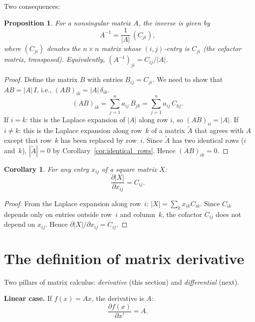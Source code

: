\documentclass[14pt]{extarticle}
\theoremstyle{plain}
\newtheorem{corollary}[theorem]{Corollary}
\newtheorem{proposition}{Proposition}
\theoremstyle{definition}
\theoremstyle{remark}
\begin{document}
Two consequences:

\begin{proposition}\label{prp:cofactor_inverse}
For a nonsingular matrix $A$, the inverse is given by
\[
A^{-1} = \frac{1}{|A|}\, (C_{ji}),
\]
where $(C_{ji})$ denotes the $n \times n$ matrix whose $(i,j)$-entry is $C_{ji}$ (the cofactor matrix, transposed). Equivalently, $(A^{-1})_{ji} = C_{ij}/|A|$.
\end{proposition}

\begin{proof}
Define the matrix $B$ with entries $B_{ij} = C_{ji}$. We need to show that $AB = |A|\, I$, i.e., $(AB)_{ik} = |A|\, \delta_{ik}$.
\[
(AB)_{ik} = \sum_{j=1}^{n} a_{ij}\, B_{jk} = \sum_{j=1}^{n} a_{ij}\, C_{kj}.
\]
If $i = k$: this is the Laplace expansion of $|A|$ along row $i$, so $(AB)_{ii} = |A|$.
If $i \neq k$: this is the Laplace expansion along row~$k$ of a matrix $\tilde{A}$ that agrees with $A$ except that row~$k$ has been replaced by row~$i$. Since $\tilde{A}$ has two identical rows ($i$ and~$k$), $|\tilde{A}| = 0$ by Corollary~\ref{cor:identical_rows}. Hence $(AB)_{ik} = 0$.
\end{proof}

\begin{corollary}\label{cor:partial_det}
For any entry $x_{ij}$ of a square matrix $X$:
\[
\frac{\partial |X|}{\partial x_{ij}} = C_{ij}.
\]
\end{corollary}

\begin{proof}
From the Laplace expansion along row~$i$: $|X| = \sum_{k} x_{ik} C_{ik}$. Since $C_{ik}$ depends only on entries outside row~$i$ and column~$k$, the cofactor $C_{ij}$ does not depend on $x_{ij}$. Hence $\partial|X|/\partial x_{ij} = C_{ij}$.
\end{proof}

\section{The definition of matrix derivative}\label{sec:3}

Two pillars of matrix calculus: \emph{derivative} (this section) and \emph{differential} (next).

\textbf{Linear case.} If $f(x) = Ax$, the derivative is $A$:
\begin{equation}\label{eq:7}
\frac{\partial f(x)}{\partial x'} = A.
\end{equation}
\end{document}
